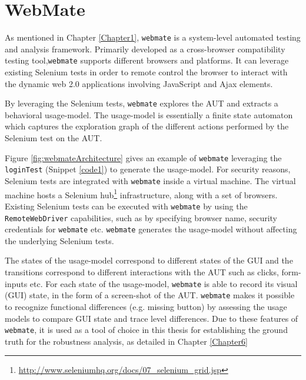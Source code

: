 \section{WebMate}
\label{sec:WebMate}
As mentioned in Chapter \ref{Chapter1}, \texttt{webmate}\cite{webmate} is a system-level automated testing and analysis framework. Primarily developed as a cross-browser compatibility testing tool,\texttt{webmate} supports different browsers and platforms. It can leverage existing Selenium tests in order to remote control the browser to interact with the dynamic web 2.0 applications involving JavaScript and Ajax elements. 

By leveraging the Selenium tests, \texttt{webmate} explores the AUT and extracts a behavioral usage-model. The usage-model is essentially a finite state automaton which captures the exploration graph of the different actions performed by the Selenium test on the AUT. 

Figure \ref{fig:webmateArchitecture} gives an example of \texttt{webmate} leveraging the \texttt{loginTest} (Snippet \ref{code1}) to generate the usage-model. For security reasons, Selenium tests are integrated with \texttt{webmate} inside a virtual machine. The virtual machine hosts a Selenium hub\footnote{\url{http://www.seleniumhq.org/docs/07_selenium_grid.jsp}} infrastructure, along with a set of browsers. Existing Selenium tests can be executed with \texttt{webmate} by using the \texttt{RemoteWebDriver} capabilities, such as by specifying browser name, security credentials for \texttt{webmate} etc. \texttt{webmate} generates the usage-model without affecting the underlying Selenium tests.

The states of the usage-model correspond to different states of the GUI and the transitions correspond to different interactions with the AUT such as clicks, form-inputs etc. For each state of the usage-model, \texttt{webmate} is able to record its visual (GUI) state, in the form of a screen-shot of the AUT. \texttt{webmate} makes it possible to recognize functional differences (e.g. missing button) by assessing the usage models to compare GUI state and trace level differences. Due to these features of \texttt{webmate}, it is used as a tool of choice in this thesis for establishing the ground truth for the robustness analysis, as detailed in Chapter \ref{Chapter6}

